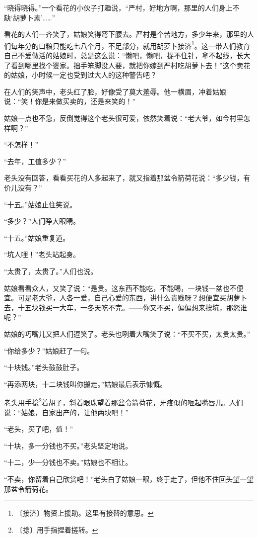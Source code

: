 \documentclass[12pt,UTF-8,openany]{ctexbook}
\begin{document}
\begin{normalsize}
    “晓得晓得。”一个看花的小伙子打趣说，“严村，好地方啊，那里的人们身上不缺‘胡萝卜素’……”
    
    看花的人们一齐笑了，姑娘笑得弯下腰去。严村是个苦地方，多少年来，那里的人们每年分的口粮只能吃七八个月，不足部分，就用胡萝卜接济\footnote{〔接济〕物资上援助。这里有接替的意思。}。这一带人们教育自己不爱做活的姑娘时，总是这么说：“懒吧，懒吧，捉不住针，拿不起线，长大了看到哪里找个婆家。拙手笨脚没人要，就把你嫁到严村吃胡萝卜去！”这个卖花的姑娘，小时候一定也受到过大人的这种警告吧？
    
    在人们的笑声中，老头红了脸，好像受了莫大羞辱。他一横眉，冲着姑娘说：“笑！你是来做买卖的，还是来笑的！”
    
    姑娘一点也不急，反倒觉得这个老头很可爱，依然笑着说：“老大爷，如今村里怎样啊？”
    
    “不怎样！”
    
    “去年，工值多少？”
    
    老头没有回答，看看买花的人多起来了，就又指着那盆令箭荷花说：“多少钱，有价儿没有？”
    
    “十五。”姑娘止住笑说。
    
    “多少？”人们睁大眼睛。
    
    “十五。”姑娘重复道。
    
    “坑人哩！”老头站起身。
    
    “太贵了，太贵了。”人们也说。
    
    姑娘看看众人，又笑了说：“是贵。这东西不能吃，不能喝，一块钱一盆也不便宜。可是老大爷，人各一爱，自己心爱的东西，讲什么贵贱呀？想便宜买胡萝卜去，十五块钱买一大车，一冬天吃不完。——你又不买，偏偏想来挨坑，那怨谁呢？”
    
    姑娘的巧嘴儿又把人们逗笑了。老头也咧着大嘴笑了说：“不买不买，太贵太贵。”
    
    “你给多少？”姑娘赶了一句。
    
    “十块钱。”老头鼓鼓肚子。
    
    “再添两块，十二块钱叫你搬走。”姑娘最后表示慷慨。
    
    老头用手捻\footnote{〔捻〕用手指捏着搓转。}着胡子，斜着眼珠望着那盆令箭荷花，牙疼似的咂起嘴唇儿。人们说：“姑娘，自家出产的，让他两块吧！”
    
    “老头，买了吧，值！”
    
    “十块，多一分钱也不买。”老头坚定地说。
    
    “十二，少一分钱也不卖。”姑娘也不相让。
    
    “不卖，你留着自己欣赏吧！”老头白了姑娘一眼，终于走了，但他不住回头望一望那盆令箭荷花。
    

\end{normalsize}
\end{document}
